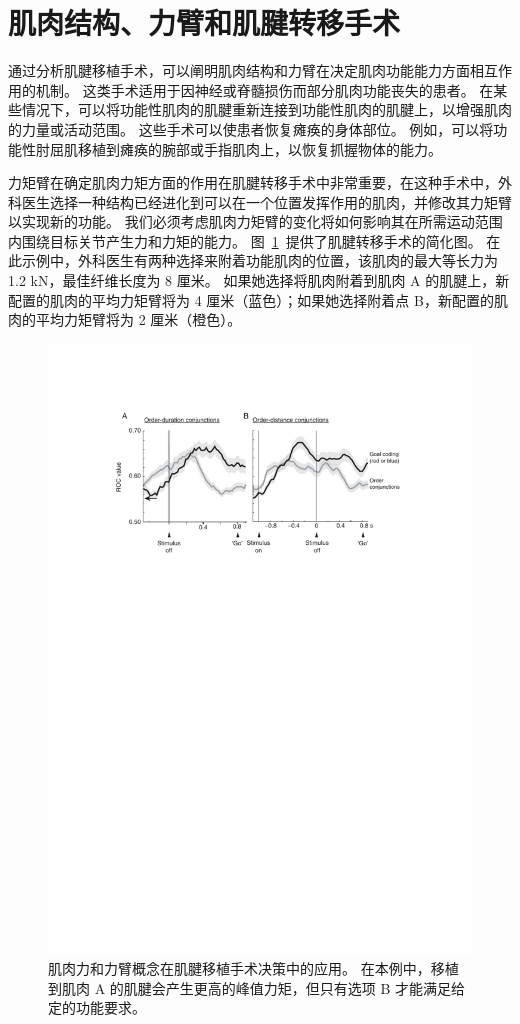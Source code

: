 \section{肌肉结构、力臂和肌腱转移手术}

通过分析肌腱移植手术，可以阐明肌肉结构和力臂在决定肌肉功能能力方面相互作用的机制。
这类手术适用于因神经或脊髓损伤而部分肌肉功能丧失的患者。
在某些情况下，可以将功能性肌肉的肌腱重新连接到功能性肌肉的肌腱上，以增强肌肉的力量或活动范围。
这些手术可以使患者恢复瘫痪的身体部位。
例如，可以将功能性肘屈肌移植到瘫痪的腕部或手指肌肉上，以恢复抓握物体的能力。


力矩臂在确定肌肉力矩方面的作用在肌腱转移手术中非常重要，在这种手术中，外科医生选择一种结构已经进化到可以在一个位置发挥作用的肌肉，并修改其力矩臂以实现新的功能。
我们必须考虑肌肉力矩臂的变化将如何影响其在所需运动范围内围绕目标关节产生力和力矩的能力。
图~\ref{fig:6_14}~提供了肌腱转移手术的简化图。
在此示例中，外科医生有两种选择来附着功能肌肉的位置，该肌肉的最大等长力为 1.2 kN，最佳纤维长度为 8 厘米。
如果她选择将肌肉附着到肌肉 A 的肌腱上，新配置的肌肉的平均力矩臂将为 4 厘米（蓝色）；如果她选择附着点 B，新配置的肌肉的平均力矩臂将为 2 厘米（橙色）。


\begin{figure}[!htb]
	\centering
	\includegraphics[width=1.0\linewidth]{chap6/6_14}
	\caption{肌肉力和力臂概念在肌腱移植手术决策中的应用。
		在本例中，移植到肌肉 A 的肌腱会产生更高的峰值力矩，但只有选项 B 才能满足给定的功能要求。 \label{fig:6_14}}
\end{figure}


